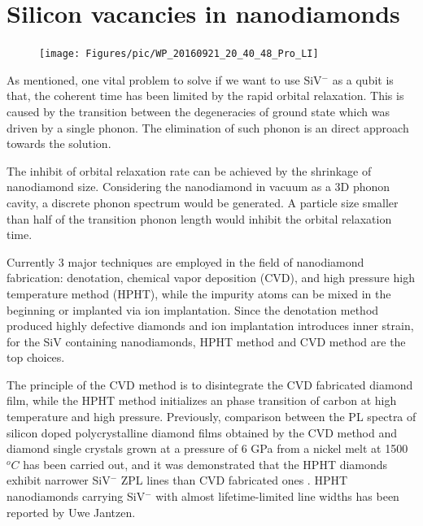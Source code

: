 
\section[Silicon vacancies in nanodiamonds]{Silicon vacancies in nanodiamonds}
\begin{figure}[h]
\centering
\texttt{[image: Figures/pic/WP\_20160921\_20\_40\_48\_Pro\_LI]}
\caption{}
\label{fig:wp20160921204048proli}
\end{figure}
As mentioned, one vital problem to solve if we want to use SiV$^{-}$ as a qubit is that, the coherent time has been limited by the rapid orbital relaxation. This is caused by the transition between the degeneracies of ground state which was driven by a single phonon. The elimination of such phonon is an direct approach towards the solution.

The inhibit of orbital relaxation rate can be achieved by the shrinkage of nanodiamond size. Considering the nanodiamond in vacuum as a 3D phonon cavity, a discrete phonon spectrum would be generated. \citep{albrecht_coupling_2013} A particle size smaller than half of the transition phonon length would inhibit the orbital relaxation time. \citep{kleppner_inhibited_1981}

Currently 3 major techniques are employed in the field of nanodiamond fabrication: denotation, chemical vapor deposition (CVD), and high pressure high temperature method (HPHT), while the impurity atoms can be mixed in the beginning or implanted via ion implantation. Since the denotation method produced highly defective diamonds and ion implantation introduces inner strain, for the SiV containing nanodiamonds, HPHT method and CVD method are the top choices.

The principle of the CVD method is to disintegrate the CVD fabricated diamond film, while the HPHT method initializes an phase transition of carbon at high temperature and high pressure. Previously, comparison between the PL spectra of silicon doped polycrystalline diamond films obtained by the CVD method and diamond single crystals grown at a pressure of 6 GPa from a nickel melt at 1500$^{o}C$ has been carried out, and it was demonstrated that the HPHT diamonds exhibit narrower SiV$^{-}$ ZPL lines than CVD fabricated ones \citep{clark_silicon_1995}. HPHT nanodiamonds carrying SiV$^{-}$ with almost lifetime-limited line widths has been reported by Uwe Jantzen. \citep{jantzen_nanodiamonds_2016}


